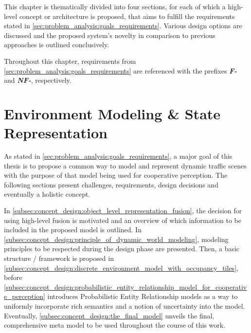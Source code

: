 This chapter is thematically divided into four sections, for each of which a high-level concept or architecture is proposed, that aims to fulfill the requirements stated in \cref{sec:problem_analysis:goals_requirements}. Various design options are discussed and the proposed system's novelty in comparison to previous approaches is outlined conclusively.

Throughout this chapter, requirements from \cref{sec:problem_analysis:goals_requirements} are referenced with the prefixes \textit{\textbf{F-}} and \textit{\textbf{NF-}}, respectively.

\section{Environment Modeling \& State Representation}
\label{sec:concept_design:environment_modeling_state_representation}
As stated in \cref{sec:problem_analysis:goals_requirements}, a major goal of this thesis is to propose a common way to model and represent dynamic traffic scenes with the purpose of that model being used for cooperative perception. The following sections present challenges, requirements, design decisions and eventually a holistic concept.

In \cref{subsec:concept_design:object_level_representation_fusion}, the decision for using high-level fusion is motivated and an overview of which information to be included in the proposed model is outlined. In \cref{subsec:concept_design:principle_of_dynamic_world_modeling}, modeling principles to be respected during the design phase are presented. Then, a basic structure / framework is proposed in \cref{subsec:concept_design:discrete_environment_model_with_occupancy_tiles}, before \cref{subsec:concept_design:probabilistic_entity_relationship_model_for_cooperative_perception} introduces Probabilistic Entity Relationship models as a way to uniformly incorporate rich semantics and a notion of uncertainty into the model. Eventually, \cref{subsec:concept_design:the_final_model} unveils the final, comprehensive meta model to be used throughout the course of this work.

